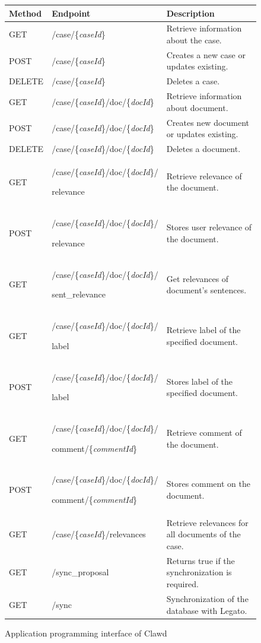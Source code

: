 \documentclass[
  digital, %
  notable,   %
  nolof,     %
  nolot,     %
]{fithesis3}
\begin{document}
\begin{figure}[h]
\centering
\caption{Application programming interface of Clawd}
\label{fig:api}
\begin{tabular}{|m{2cm}|m{5.5cm}|m{5cm}|}
\hline
\rowcolor{gray!30}
\textbf{Method} &  \textbf{Endpoint}   &  \vspace{0.2cm} \textbf{Description}   \\[10pt] \hline
GET  &  /case/\{\textit{caseId}\} & Retrieve information about the case. \\ \hline
POST  & /case/\{\textit{caseId}\} & Creates a new case or updates existing. \\ \hline
DELETE  & /case/\{\textit{caseId}\} & Deletes a case.  \\[6pt] \hline
GET  & /case/\{\textit{caseId}\}/doc/\{\textit{docId}\} & Retrieve information about document. \\ \hline
POST  & /case/\{\textit{caseId}\}/doc/\{\textit{docId}\} & Creates new document or updates existing. \\ \hline
DELETE  & /case/\{\textit{caseId}\}/doc/\{\textit{docId}\} & Deletes a document. \\[6pt] \hline
GET  & /case/\{\textit{caseId}\}/doc/\{\textit{docId}\}/\par relevance & Retrieve relevance of the document. \\ \hline
POST  & /case/\{\textit{caseId}\}/doc/\{\textit{docId}\}/\par relevance & Stores user relevance of the document.\\ \hline
GET  & /case/\{\textit{caseId}\}/doc/\{\textit{docId}\}/\par sent\_relevance & Get relevances of document's sentences.\\ \hline
GET  & /case/\{\textit{caseId}\}/doc/\{\textit{docId}\}/\par label & Retrieve label of the specified document. \\ \hline
POST  & /case/\{\textit{caseId}\}/doc/\{\textit{docId}\}/\par label & Stores label of the specified document. \\ \hline
GET  & /case/\{\textit{caseId}\}/doc/\{\textit{docId}\}/\par comment/\{\textit{commentId}\} & Retrieve comment of the document. \\ \hline
POST  & /case/\{\textit{caseId}\}/doc/\{\textit{docId}\}/\par comment/\{\textit{commentId}\} & Stores comment on the document. \\ \hline
GET  & /case/\{\textit{caseId}\}/relevances & Retrieve relevances for all documents of the case. \\ \hline
GET  & /sync\_proposal & Returns true if the synchronization is required. \\ \hline
GET  & /sync & Synchronization of the database with Legato. \\ \hline
\end{tabular}
\end{figure}
\end{document}
